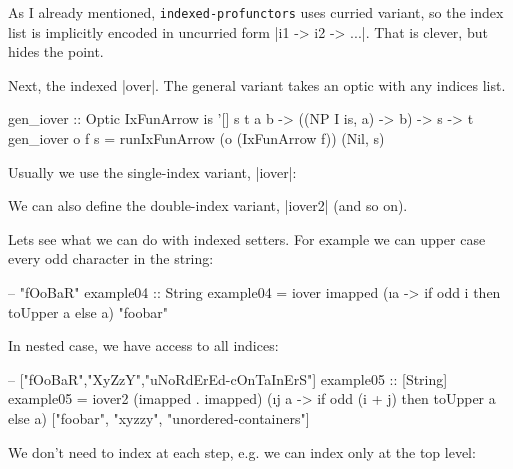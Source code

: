
As I already mentioned, \texttt{indexed-profunctors} uses curried
variant, so the index list is implicitly encoded in uncurried
form |i1 -> i2 -> ...|.
That is clever, but hides the point.

Next, the indexed |over|.
The general variant takes an optic with any indices list.

\begin{code}
gen_iover :: Optic IxFunArrow is '[] s t a b
         -> ((NP I is, a) -> b)
         -> s -> t
gen_iover o f s = runIxFunArrow (o (IxFunArrow f)) (Nil, s)
\end{code}

Usually we use the single-index variant, |iover|:


We can also define the double-index variant, |iover2| (and so on).


Lets see what we can do with indexed setters.
For example we can upper case every odd character in the string:

\begin{code}
-- "fOoBaR"
example04 :: String
example04 = iover imapped (\i a -> if odd i then toUpper a else a) "foobar"
\end{code}

In nested case, we have access to all indices:

\begin{code}
-- ["fOoBaR","XyZzY","uNoRdErEd-cOnTaInErS"]
example05 :: [String]
example05 = iover2
    (imapped . imapped)
    (\i j a -> if odd (i + j) then toUpper a else a)
    ["foobar", "xyzzy", "unordered-containers"]
\end{code}

We don't need to index at each step,
e.g. we can index only at the top level:

